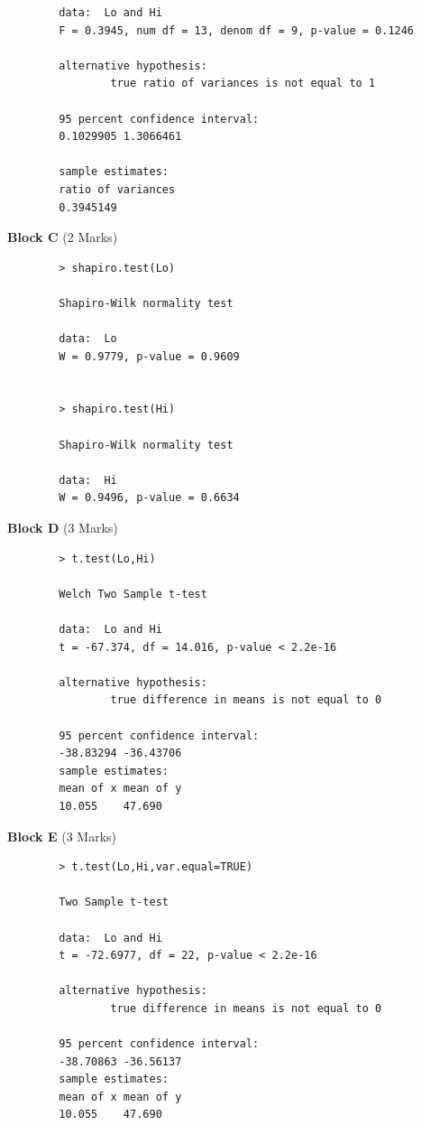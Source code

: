 \documentclass[a4paper,12pt]{article}
\begin{document}
\begin{itemize}
\begin{framed}
\begin{verbatim}
		data:  Lo and Hi
		F = 0.3945, num df = 13, denom df = 9, p-value = 0.1246
		
		alternative hypothesis: 
				true ratio of variances is not equal to 1
		
		95 percent confidence interval:
		0.1029905 1.3066461
		
		sample estimates:
		ratio of variances 
		0.3945149
		\end{verbatim}
	\end{framed}
	
\noindent \textbf{Block C} (2 Marks)
	\begin{framed}
		\begin{verbatim}
		> shapiro.test(Lo)
		
		Shapiro-Wilk normality test
		
		data:  Lo
		W = 0.9779, p-value = 0.9609
		
		
		> shapiro.test(Hi)
		
		Shapiro-Wilk normality test
		
		data:  Hi
		W = 0.9496, p-value = 0.6634
		\end{verbatim}
	\end{framed}
\newpage
\noindent \textbf{Block D} (3 Marks)
	\begin{framed}
		\begin{verbatim}
		> t.test(Lo,Hi)
		
		Welch Two Sample t-test
		
		data:  Lo and Hi
		t = -67.374, df = 14.016, p-value < 2.2e-16
		
		alternative hypothesis: 
				true difference in means is not equal to 0
		
		95 percent confidence interval:
		-38.83294 -36.43706
		sample estimates:
		mean of x mean of y 
		10.055    47.690 
		\end{verbatim}
	\end{framed}

\noindent \textbf{Block E} (3 Marks)
	\begin{framed}
		\begin{verbatim}
		> t.test(Lo,Hi,var.equal=TRUE)
		
		Two Sample t-test
		
		data:  Lo and Hi
		t = -72.6977, df = 22, p-value < 2.2e-16
		
		alternative hypothesis: 
				true difference in means is not equal to 0
				
		95 percent confidence interval:
		-38.70863 -36.56137
		sample estimates:
		mean of x mean of y 
		10.055    47.690 
		

\end{verbatim}
\end{framed}
\end{itemize}
\end{document}
